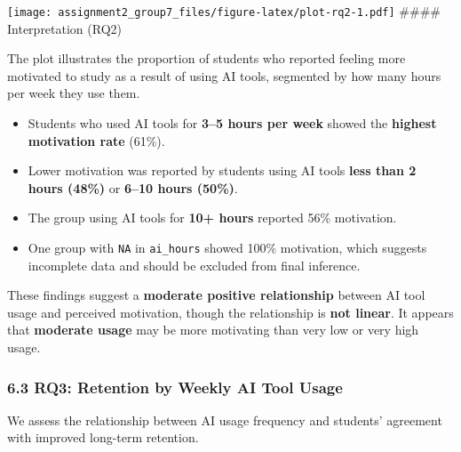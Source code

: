 \documentclass[
]{article}
\providecommand{\tightlist}{%
  \setlength{\itemsep}{0pt}\setlength{\parskip}{0pt}}
\begin{document}
\texttt{[image: assignment2\_group7\_files/figure-latex/plot-rq2-1.pdf]}
\#\#\#\# Interpretation (RQ2)

The plot illustrates the proportion of students who reported feeling
more motivated to study as a result of using AI tools, segmented by how
many hours per week they use them.

\begin{itemize}
\tightlist
\item
  Students who used AI tools for \textbf{3--5 hours per week} showed the
  \textbf{highest motivation rate} (61\%).
\item
  Lower motivation was reported by students using AI tools \textbf{less
  than 2 hours (48\%)} or \textbf{6--10 hours (50\%)}.
\item
  The group using AI tools for \textbf{10+ hours} reported 56\%
  motivation.
\item
  One group with \texttt{NA} in \texttt{ai\_hours} showed 100\%
  motivation, which suggests incomplete data and should be excluded from
  final inference.
\end{itemize}

These findings suggest a \textbf{moderate positive relationship} between
AI tool usage and perceived motivation, though the relationship is
\textbf{not linear}. It appears that \textbf{moderate usage} may be more
motivating than very low or very high usage.

\subsubsection{6.3 RQ3: Retention by Weekly AI Tool
Usage}\label{rq3-retention-by-weekly-ai-tool-usage}

We assess the relationship between AI usage frequency and students'
agreement with improved long-term retention.
\end{document}

